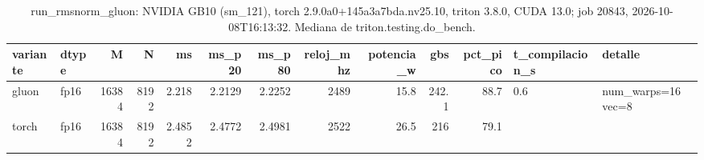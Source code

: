\begin{table}[htbp]
  \centering\small
  \begin{tabular}{llrrrrrrrrrll}
    \toprule
    variante & dtype & M & N & ms & ms\_p20 & ms\_p80 & reloj\_mhz & potencia\_w & gbs & pct\_pico & t\_compilacion\_s & detalle \\
    \midrule
    gluon & fp16 & 16384 & 8192 & 2.218 & 2.2129 & 2.2252 & 2489 & 15.8 & 242.1 & 88.7 & 0.6 & num\_warps=16 vec=8 \\
    torch & fp16 & 16384 & 8192 & 2.4852 & 2.4772 & 2.4981 & 2522 & 26.5 & 216 & 79.1 &  &  \\
    \bottomrule
  \end{tabular}
  \caption{run\_rmsnorm\_gluon: NVIDIA GB10 (sm\_121), torch 2.9.0a0+145a3a7bda.nv25.10, triton 3.8.0, CUDA 13.0; job 20843, 2026-10-08T16:13:32. Mediana de triton.testing.do\_bench.}
  \label{tab:hennessy-frio-run-rmsnorm-gluon}
\end{table}
